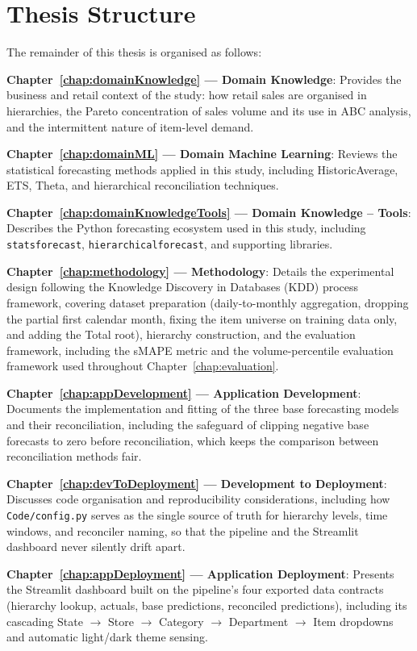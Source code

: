 \section{Thesis Structure}

The remainder of this thesis is organised as follows:

\textbf{Chapter~\ref{chap:domainKnowledge} — Domain Knowledge}: Provides the business and retail context of the study: how retail sales are organised in hierarchies, the Pareto concentration of sales volume and its use in ABC analysis, and the intermittent nature of item-level demand.

\textbf{Chapter~\ref{chap:domainML} — Domain Machine Learning}: Reviews the statistical forecasting methods applied in this study, including HistoricAverage, ETS, Theta, and hierarchical reconciliation techniques.

\textbf{Chapter~\ref{chap:domainKnowledgeTools} — Domain Knowledge – Tools}: Describes the Python forecasting ecosystem used in this study, including \texttt{statsforecast}, \texttt{hierarchicalforecast}, and supporting libraries.

\textbf{Chapter~\ref{chap:methodology} — Methodology}: Details the experimental design following the Knowledge Discovery in Databases (KDD) process framework, covering dataset preparation (daily-to-monthly aggregation, dropping the partial first calendar month, fixing the item universe on training data only, and adding the Total root), hierarchy construction, and the evaluation framework, including the sMAPE metric and the volume-percentile evaluation framework used throughout Chapter~\ref{chap:evaluation}.

\textbf{Chapter~\ref{chap:appDevelopment} — Application Development}: Documents the implementation and fitting of the three base forecasting models and their reconciliation, including the safeguard of clipping negative base forecasts to zero before reconciliation, which keeps the comparison between reconciliation methods fair.

\textbf{Chapter~\ref{chap:devToDeployment} — Development to Deployment}: Discusses code organisation and reproducibility considerations, including how \texttt{Code/config.py} serves as the single source of truth for hierarchy levels, time windows, and reconciler naming, so that the pipeline and the Streamlit dashboard never silently drift apart.

\textbf{Chapter~\ref{chap:appDeployment} — Application Deployment}: Presents the Streamlit dashboard built on the pipeline's four exported data contracts (hierarchy lookup, actuals, base predictions, reconciled predictions), including its cascading State \(\rightarrow\) Store \(\rightarrow\) Category \(\rightarrow\) Department \(\rightarrow\) Item dropdowns and automatic light/dark theme sensing.

